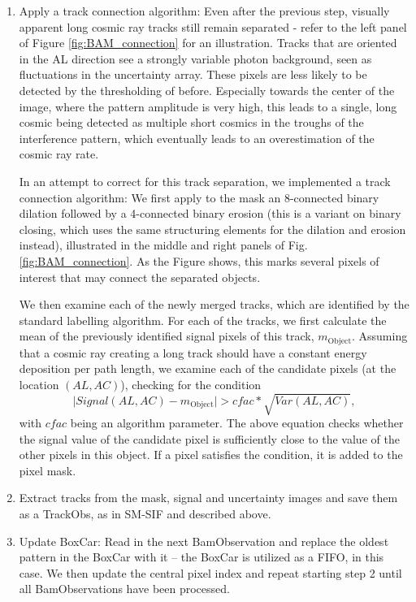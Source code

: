 \documentclass[a4paper, 11pt]{article}
\begin{document}
\begin{enumerate}
  \item Apply a track connection algorithm: Even after the previous step, visually apparent long cosmic ray tracks still remain separated - refer to the left panel of Figure \ref{fig:BAM_connection} for an illustration. Tracks that are oriented in the AL direction see a strongly variable photon background, seen as fluctuations in the uncertainty array. These pixels are less likely to be detected by the thresholding of before. Especially towards the center of the image, where the pattern amplitude is very high, this leads to a single, long cosmic being detected as multiple short cosmics in the troughs of the interference pattern, which eventually leads to an overestimation of the cosmic ray rate.

    In an attempt to correct for this track separation, we implemented a track connection algorithm: We first apply to the mask an 8-connected binary dilation followed by a 4-connected binary erosion (this is a variant on binary closing, which uses the same structuring elements for the dilation and erosion instead), illustrated in the middle and right panels of Fig. \ref{fig:BAM_connection}. As the Figure shows, this marks several pixels of interest that may connect the separated objects.

    We then examine each of the newly merged tracks, which are identified by the standard labelling algorithm. For each of the tracks, we first calculate the mean of the previously identified signal pixels of this track, $m_\mathrm{Object}$. Assuming that a cosmic ray creating a long track should have a constant energy deposition per path length, we examine each of the candidate pixels (at the location $\left(AL,AC\right)$), checking for the condition
    \begin{equation*}
      \lvert Signal\left( AL,AC \right) - m_\mathrm{Object}\rvert > cfac * \sqrt{Var\left( AL,AC \right)},
    \end{equation*}
    with $cfac$ being an algorithm parameter. The above equation checks whether the signal value of the candidate pixel is sufficiently close to the value of the other pixels in this object. If a pixel satisfies the condition, it is added to the pixel mask. 
  \item Extract tracks from the mask, signal and uncertainty images and save them as a TrackObs, as in SM-SIF and described above.
  \item Update BoxCar: Read in the next BamObservation and replace the oldest pattern in the BoxCar with it -- the BoxCar is utilized as a FIFO, in this case. We then update the central pixel index and repeat starting step 2 until all BamObservations have been processed.
\end{enumerate}
\end{document}
